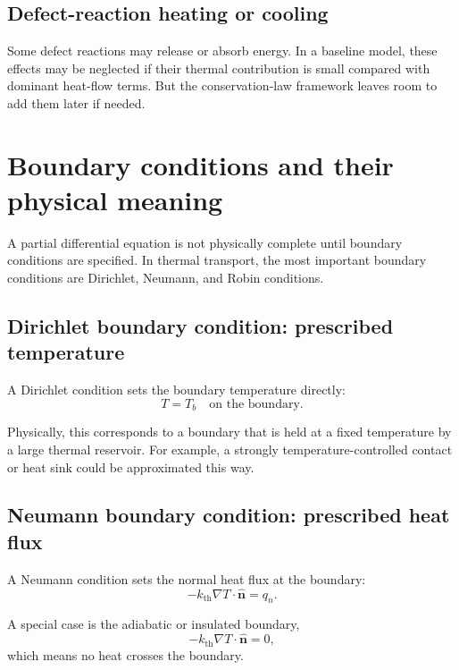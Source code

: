 \documentclass[11pt]{article}
\newcommand{\nvec}{\hat{\mathbf{n}}}
\newcommand{\kth}{k_{\mathrm{th}}}
\begin{document}
\subsection{Defect-reaction heating or cooling}

Some defect reactions may release or absorb energy. In a baseline model, these effects may be neglected if their thermal contribution is small compared with dominant heat-flow terms. But the conservation-law framework leaves room to add them later if needed.

\section{Boundary conditions and their physical meaning}

A partial differential equation is not physically complete until boundary conditions are specified. In thermal transport, the most important boundary conditions are Dirichlet, Neumann, and Robin conditions.

\subsection{Dirichlet boundary condition: prescribed temperature}

A Dirichlet condition sets the boundary temperature directly:
\begin{equation}
T = T_b \quad \text{on the boundary.}
\end{equation}

Physically, this corresponds to a boundary that is held at a fixed temperature by a large thermal reservoir. For example, a strongly temperature-controlled contact or heat sink could be approximated this way.

\subsection{Neumann boundary condition: prescribed heat flux}

A Neumann condition sets the normal heat flux at the boundary:
\begin{equation}
-\kth \nabla T \cdot \nvec = q_n.
\end{equation}

A special case is the adiabatic or insulated boundary,
\begin{equation}
-\kth \nabla T \cdot \nvec = 0,
\end{equation}
which means no heat crosses the boundary.
\end{document}
